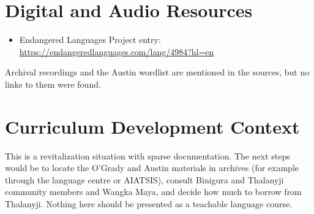 \documentclass[12pt]{article}
\begin{document}
\section{Digital and Audio Resources}
\begin{itemize}
\item Endangered Languages Project entry: \url{https://endangeredlanguages.com/lang/4984?hl=en}
\end{itemize}
Archival recordings and the Austin wordlist are mentioned in the sources, but no links to them were found.

\section{Curriculum Development Context}
This is a revitalization situation with sparse documentation. The next steps would be to locate the O'Grady and Austin materials in archives (for example through the language centre or AIATSIS), consult Binigura and Thalanyji community members and Wangka Maya, and decide how much to borrow from Thalanyji. Nothing here should be presented as a teachable language course.
\end{document}

